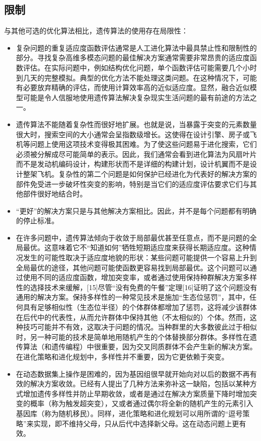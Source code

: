 \subsection{限制}
与其他可选的优化算法相比，遗传算法的使用存在局限性：
\begin{itemize}
\item 复杂问题的重复适应度函数评估通常是人工进化算法中最具禁止性和限制性的部分。寻找复杂高维多模态问题的最佳解决方案通常需要非常昂贵的适应度函数评估。在实际问题中，例如结构优化问题，单个函数评估可能需要几个小时到几天的完整模拟。典型的优化方法不能处理这类问题。在这种情况下，可能有必要放弃精确的评估，而使用计算效率高的近似适应度。显然，融合近似模型可能是令人信服地使用遗传算法解决复杂现实生活问题的最有前途的方法之一。
\item 遗传算法不能随着复杂性而很好地扩展。也就是说，当暴露于突变的元素数量很大时，搜索空间的大小通常会呈指数级增长。这使得在设计引擎、房子或飞机等问题上使用这项技术变得极其困难。为了使这些问题易于进化搜索，它们必须被分解成尽可能简单的表示。因此，我们通常会看到进化算法为风扇叶片而不是发动机编码设计，构建形状而不是详细的构建计划，设计机翼而不是设计整架飞机。复杂性的第二个问题是如何保护已经进化为代表好的解决方案的部件免受进一步破坏性突变的影响，特别是当它们的适应度评估要求它们与其他部件很好地结合时。
\item “更好”的解决方案只是与其他解决方案相比。因此，并不是每个问题都有明确的停止标准。
\item 在许多问题中，遗传算法倾向于收敛于局部最优甚至任意点，而不是问题的全局最优。这意味着它不“知道如何”牺牲短期适应度来获得长期适应度。这种情况发生的可能性取决于适应度地貌的形状：某些问题可能提供一个容易上升到全局最优的途径，其他问题可能使函数更容易找到局部最优。这个问题可以通过使用不同的适应度函数，增加突变率，或者通过使用保持种群解决方案多样性的选择技术来缓解，[15]尽管“没有免费的午餐”定理[16]证明了这个问题没有通用的解决方案。保持多样性的一种常见技术是施加“生态位惩罚”，其中，任何具有足够相似性（生态位半径）的个体群体都增加了惩罚，这将减少该群体在后代中的代表性，从而允许群体中保持其他（不太相似的）个体。然而，这种技巧可能并不有效，这取决于问题的情况。当种群里的大多数彼此过于相似时，另一种可能的技术是简单地用随机产生的个体替换部分群体。多样性在遗传算法（和遗传编程）中很重要，因为交叉同质群体不会产生新的解决方案。在进化策略和进化规划中，多样性并不重要，因为它更依赖于突变。
\item 在动态数据集上操作是困难的，因为基因组很早就开始向对以后的数据不再有效的解决方案收敛。已经有人提出了几种方法来弥补这一缺陷，包括以某种方式增加遗传多样性并防止早期收敛，或者是通过在解决方案质量下降时增加突变的概率（称为触发超突变），又或者通过偶尔将全新的随机产生的元素引入基因库（称为随机移民）。同样，进化策略和进化规划可以用所谓的“逗号策略”来实现，即不维持父母，只从后代中选择新父母。这在动态问题上更有效。

\end{itemize}
